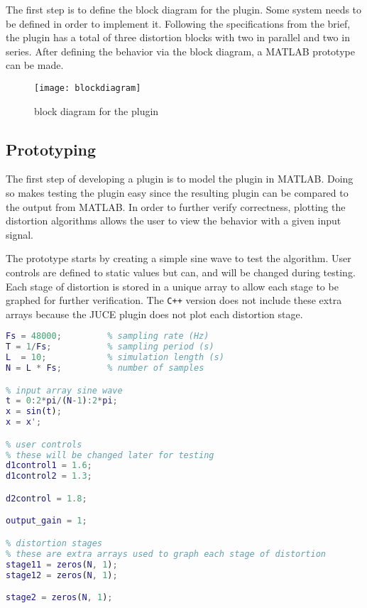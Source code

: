 \documentclass{article}
\begin{document}
The first step is to define the block diagram for the plugin. Some system needs to be
defined in order to implement it. Following the specifications from the brief, the plugin has a total
of three distortion blocks with two in parallel and two in series. After defining the behavior
via the block diagram, a MATLAB prototype can be made.

\begin{figure}[h]
\centerline{\texttt{[image: blockdiagram]}}
\caption{block diagram for the plugin}
\end{figure}

\pagebreak
\subsection{Prototyping}
The first step of developing a plugin is to model the plugin in MATLAB.
Doing so makes testing the plugin easy since the resulting plugin can be compared
to the output from MATLAB. In order to further verify correctness, plotting
the distortion algorithms allows the user to view the behavior with a given input signal.

The prototype starts by creating a simple sine wave to test the
algorithm. User controls are defined to static values but can, and will be changed
during testing. Each stage of distortion is stored in a unique array to allow each
stage to be graphed for further verification. The \lstinline{C++} version does
not include these extra arrays because the JUCE plugin does not plot each distortion
stage.

\begin{lstlisting}[language=MATLAB]
% params
Fs = 48000;         % sampling rate (Hz)
T = 1/Fs;           % sampling period (s)
L  = 10;            % simulation length (s)
N = L * Fs;         % number of samples

% input array sine wave
t = 0:2*pi/(N-1):2*pi;
x = sin(t);
x = x';

% user controls
% these will be changed later for testing
d1control1 = 1.6;
d1control2 = 1.3;

d2control = 1.8;

output_gain = 1;

% distortion stages
% these are extra arrays used to graph each stage of distortion
stage11 = zeros(N, 1);
stage12 = zeros(N, 1);

stage2 = zeros(N, 1);
\end{lstlisting}
\end{document}
